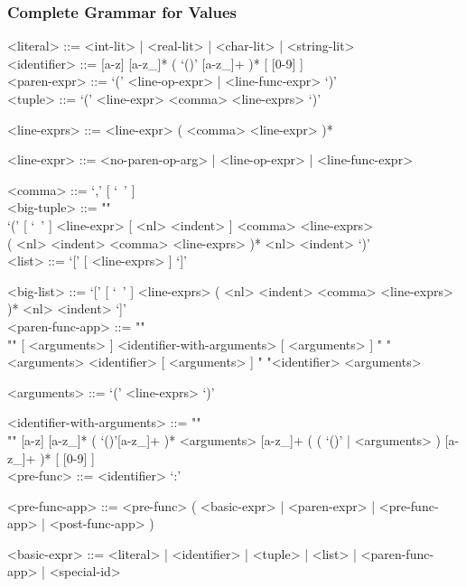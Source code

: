 \documentclass{article}
\begin{document}
\subsubsection{Complete Grammar for Values}
\begin{grammar}

<literal> ::= <int-lit> | <real-lit> | <char-lit> | <string-lit>
\\

<identifier> ::= [a-z] [a-z_]* ( `()' [a-z_]+ )* [ [0-9] ]
\\

<paren-expr> ::= `(' <line-op-expr> | <line-func-expr> `)'  
\\

<tuple> ::= `(' <line-expr> <comma> <line-exprs> `)'

<line-exprs> ::= <line-expr> ( <comma> <line-expr> )*

<line-expr> ::= <no-paren-op-arg> | <line-op-expr> | <line-func-expr>

<comma> ::= `,' [ `\ ' ]
\\

<big-tuple> ::= ""\\
`(' [ `\ ' ] <line-expr> [ <nl> <indent> ] <comma> <line-exprs> \\
( <nl> <indent> <comma> <line-exprs> )* 
<nl> <indent> `)'
\\

<list> ::= `[' [ <line-exprs> ] `]'

<big-list> ::= 
`[' [ `\ ' ] <line-exprs> ( <nl> <indent> <comma> <line-exprs> )* <nl> <indent> `]'
\\

<paren-func-app> ::= ""\\""
[ <arguments> ] <identifier-with-arguments> [ <arguments> ]
\alt " "<arguments> <identifier> [ <arguments> ]
\alt " "<identifier> <arguments>

<arguments> ::= `(' <line-exprs> `)'

<identifier-with-arguments> ::= ""\\""
[a-z] [a-z_]* ( `()'[a-z_]+ )* <arguments>
[a-z_]+ ( ( `()' | <arguments> ) [a-z_]+ )* 
[ [0-9] ]
\\

<pre-func> ::= <identifier> `:'

<pre-func-app> ::=
<pre-func> ( <basic-expr> | <paren-expr> | <pre-func-app> | <post-func-app> )

<basic-expr> ::=
<literal> | <identifier> | <tuple> | <list> | <paren-func-app> | <special-id>
\\


\end{grammar}
\end{document}
